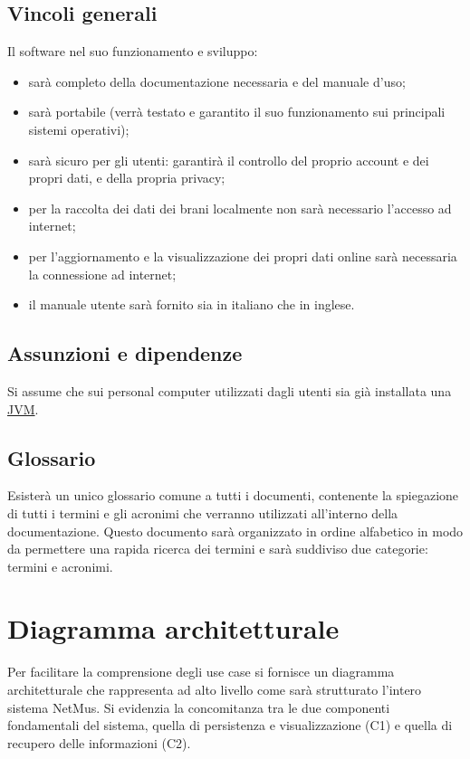 \section{Vincoli generali}
Il software nel suo funzionamento e sviluppo:
\begin{itemize}
  \item sar\`a completo della documentazione necessaria e del manuale d'uso;
  \item sar\`a portabile (verr\`a testato e garantito il suo funzionamento sui
  principali sistemi operativi);
  \item sar\`a sicuro per gli utenti: garantir\`a il controllo del proprio account e
  dei propri dati, e della propria privacy;
  \item per la raccolta dei dati dei brani localmente non sar\`a necessario
  l'accesso ad internet;
  \item per l'aggiornamento e la visualizzazione dei propri dati online sar\`a
  necessaria la connessione ad internet;
  \item il manuale utente sar\`a fornito sia in italiano che in inglese.
\end{itemize}

\section{Assunzioni e dipendenze}
Si assume che sui personal computer utilizzati dagli utenti sia gi\`a installata
una \underline{JVM}.

\section{Glossario}
Esister\`a un unico glossario comune a tutti i documenti, contenente la
spiegazione di tutti i termini e gli acronimi che verranno utilizzati
all'interno della documentazione. Questo documento sar\`a organizzato in ordine
alfabetico in modo da permettere una rapida ricerca dei termini e sar\`a suddiviso
due categorie: termini e acronimi.

\chapter{Diagramma architetturale}
\thispagestyle{fancy}
Per facilitare la comprensione degli use case si fornisce un diagramma
architetturale che rappresenta ad alto livello come sar\`a strutturato l'intero
sistema NetMus. Si evidenzia la concomitanza tra le due componenti fondamentali
del sistema, quella di persistenza e visualizzazione (C1) e quella di
recupero delle informazioni (C2).
\vspace{1cm}

